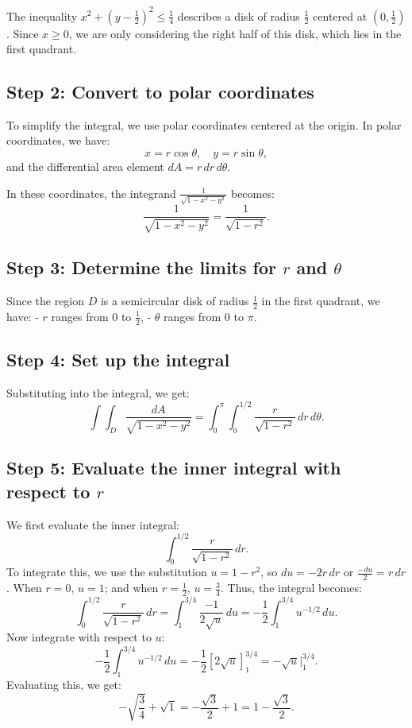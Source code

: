 \documentclass[11pt]{article}
\begin{document}
The inequality \( x^2 + (y - \frac{1}{2})^2 \leq \frac{1}{4} \) describes a disk of radius \( \frac{1}{2} \) centered at \( (0, \frac{1}{2}) \). Since \( x \geq 0 \), we are only considering the right half of this disk, which lies in the first quadrant.
\newpage

\subsection{Step 2: Convert to polar coordinates}

To simplify the integral, we use polar coordinates centered at the origin. In polar coordinates, we have:
\[
x = r \cos \theta, \quad y = r \sin \theta,
\]
and the differential area element \( dA = r \, dr \, d\theta \).

In these coordinates, the integrand \( \frac{1}{\sqrt{1 - x^2 - y^2}} \) becomes:
\[
\frac{1}{\sqrt{1 - x^2 - y^2}} = \frac{1}{\sqrt{1 - r^2}}.
\]
\newpage

\subsection{Step 3: Determine the limits for \( r \) and \( \theta \)}

Since the region \( D \) is a semicircular disk of radius \( \frac{1}{2} \) in the first quadrant, we have:
- \( r \) ranges from \( 0 \) to \( \frac{1}{2} \),
- \( \theta \) ranges from \( 0 \) to \( \pi \).
\newpage

\subsection{Step 4: Set up the integral}

Substituting into the integral, we get:
\[
\int \int_{D} \frac{dA}{\sqrt{1 - x^2 - y^2}} = \int_{0}^{\pi} \int_{0}^{1/2} \frac{r}{\sqrt{1 - r^2}} \, dr \, d\theta.
\]
\newpage

\subsection{Step 5: Evaluate the inner integral with respect to \( r \)}

We first evaluate the inner integral:
\[
\int_{0}^{1/2} \frac{r}{\sqrt{1 - r^2}} \, dr.
\]
To integrate this, we use the substitution \( u = 1 - r^2 \), so \( du = -2r \, dr \) or \( \frac{-du}{2} = r \, dr \). When \( r = 0 \), \( u = 1 \); and when \( r = \frac{1}{2} \), \( u = \frac{3}{4} \). Thus, the integral becomes:
\[
\int_{0}^{1/2} \frac{r}{\sqrt{1 - r^2}} \, dr = \int_{1}^{3/4} \frac{-1}{2 \sqrt{u}} \, du = -\frac{1}{2} \int_{1}^{3/4} u^{-1/2} \, du.
\]
Now integrate with respect to \( u \):
\[
-\frac{1}{2} \int_{1}^{3/4} u^{-1/2} \, du = -\frac{1}{2} \left[ 2 \sqrt{u} \right]_{1}^{3/4} = -\sqrt{u} \Big|_{1}^{3/4}.
\]
Evaluating this, we get:
\[
-\sqrt{\frac{3}{4}} + \sqrt{1} = -\frac{\sqrt{3}}{2} + 1 = 1 - \frac{\sqrt{3}}{2}.
\]
\newpage
\end{document}
